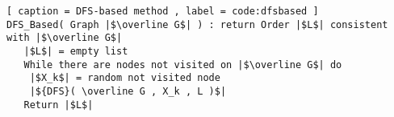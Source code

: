 \begin{lstlisting}[ caption = DFS-based method , label = code:dfsbased ]
DFS_Based( Graph |$\overline G$| ) : return Order |$L$| consistent with |$\overline G$|
   |$L$| = empty list
   While there are nodes not visited on |$\overline G$| do
	|$X_k$| = random not visited node
	|${DFS}( \overline G , X_k , L )$|
   Return |$L$|
\end{lstlisting}